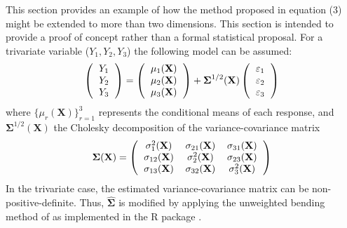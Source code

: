 This section provides an example of how the method proposed in equation (3) might be extended to more than two dimensions. This section is intended to provide a proof of concept rather than a formal statistical proposal. For a trivariate variable ($Y_1, Y_2, Y_3$) the following model can be assumed:
\begin{equation}
	\left( {
		\begin{tabular} {c}
			$Y_1$ \\
			$Y_2$\\
			$Y_3$\
		\end{tabular}
	}\right) = \left( {
		\begin{tabular} {c}
			$\mu_1(\textbf{X})$ \\
			$\mu_2(\textbf{X})$\\
			$\mu_3(\textbf{X})$\
		\end{tabular}
	}\right)
	+  \boldsymbol{\Sigma}^{1/2} (\textbf{X})
	\left( {
		\begin{tabular} {c}
			$\varepsilon_1$ \\
			$\varepsilon_2$\\
			$\varepsilon_3$\\
		\end{tabular}
	}\right)
	\label{mod3}
\end{equation}
\noindent
where $\{\mu_r(\textbf{X})\}_{r=1}^3$ represents the conditional means of each response, and $\boldsymbol{\Sigma}^{1/2} (\textbf{X})$ the Cholesky decomposition of the variance-covariance matrix
\begin{equation}
	\boldsymbol{\Sigma} (\textbf{X})=\left({
		\begin{tabular} {ccc}
			$\sigma_1^2 (\textbf{X})$  &  $ \sigma_{21} (\textbf{X})$&  $ \sigma_{31} (\textbf{X})$\\
			$\sigma_{12} (\textbf{X})$ & $\sigma_2^2 (\textbf{X})$&  $ \sigma_{23} (\textbf{X})$  \\
			$\sigma_{13} (\textbf{X})$ & $\sigma_{32} (\textbf{X})$ &  $ \sigma_3^2 (\textbf{X})$ \\
	\end{tabular}}\right)
\end{equation}
In the trivariate case, the estimated variance-covariance matrix can be non-positive-definite. Thus, $\hat{\boldsymbol{\Sigma}}$ is modified by applying the unweighted bending method of \cite{schaeffer2014making} as implemented in the  R package \citep{nilforooshan2020mbend}.




